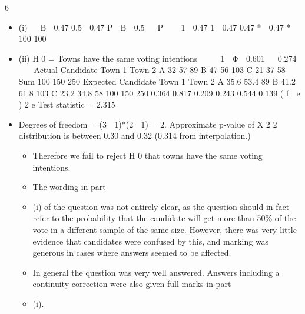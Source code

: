 \documentclass[a4paper,12pt]{article}
\begin{document}
\newpage

6
\begin{itemize}
\item (i) 

B  0.47
0.5  0.47
P  B  0.5   P 


1  0.47
1  0.47
0.47 *
 0.47 *
100
100

\item (ii) H 0 = Towns have the same voting intentions


  1  Φ  0.601   0.274



Actual Candidate
Town 1
Town 2 A
32
57
89 B
47
56
103 C
21
37
58 Sum
100
150
250
Expected Candidate
Town 1
Town 2 A
35.6
53.4
89 B
41.2
61.8
103 C
23.2
34.8
58 100
150
250
0.364 0.817 0.209 0.243 0.544 0.139
( f  e ) 2
e
Test statistic = 2.315
\item Degrees of freedom = (3  1)*(2  1) = 2. Approximate p-value of X 2 2
distribution is between 0.30 and 0.32 (0.314 from interpolation.)
\begin{itemize}
\item Therefore we fail to reject H 0 that towns have the same voting intentions.
\item The wording in part \item (i) of the question was not entirely clear, as the question should in fact refer to the probability that the candidate will get more than 50\% of the vote in a different sample of the same size. However, there was very little evidence that candidates were confused by this, and marking was generous in cases where answers seemed to be affected. 
\item In general the question was very well answered. Answers including a continuity correction
were also given full marks in part \item (i).
\end{itemize}
\end{itemize}
\end{document}
